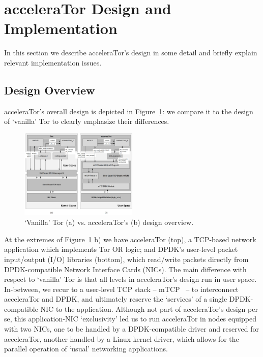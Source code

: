 \section{acceleraTor Design and Implementation}
\label{sec:design}

In this section we describe acceleraTor's design in some detail and briefly 
explain relevant implementation issues.

\subsection{Design Overview}
\label{subsec:design-overview}

acceleraTor's overall design is depicted in Figure~\ref{fig:accelerator-design}: we 
compare it to the design of `vanilla' Tor to clearly emphasize their differences.

\begin{figure}[h!]

    \centering
    \includegraphics[width=0.50\textwidth]{figures/design.png}
    \cprotect\caption{`Vanilla' Tor (a) vs. acceleraTor's (b) design overview.}
    \label{fig:accelerator-design}

\end{figure}

At the extremes of Figure~\ref{fig:accelerator-design} b) we have acceleraTor (top), a TCP-based network 
application which implements Tor OR logic; and DPDK's user-level packet input\slash output 
(I\slash O) libraries (bottom), which read\slash write packets directly 
from DPDK-compatible Network Interface Cards (NICs). 
The main difference with respect to `vanilla' Tor is that all levels in 
acceleraTor's design run in user space. In-between, we recur to a user-level 
TCP stack -- mTCP~\cite{179773} -- to interconnect acceleraTor and DPDK, 
and ultimately reserve the `services' of 
a single DPDK-compatible NIC to the application. Although not 
part of acceleraTor's design per se, this 
application-NIC `exclusivity' led us to run acceleraTor in nodes equipped with 
two NICs, one to be handled by a DPDK-compatible driver and reserved for 
acceleraTor, another handled by a Linux kernel driver, which allows for the parallel operation of `usual' 
networking applications.

